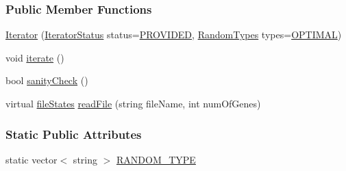 \subsubsection*{Public Member Functions}
\begin{DoxyCompactItemize}
\item 
\hyperlink{class_iterator_ab920b49c3035b9ca62557f9c211a9a12}{Iterator} (\hyperlink{class_iterator_a1eb24c519953c2a333ea4a345b0c679c}{Iterator\+Status} status=\hyperlink{class_iterator_a1eb24c519953c2a333ea4a345b0c679ca5988fd5ab1694c99fea267cb1bd5b980}{P\+R\+O\+V\+I\+D\+E\+D}, \hyperlink{class_iterator_a68bc1c5e7ad39ed78690beaa8a607430}{Random\+Types} types=\hyperlink{class_iterator_a68bc1c5e7ad39ed78690beaa8a607430ac26704076bf61ec7a63ef3ece6440a05}{O\+P\+T\+I\+M\+A\+L})
\item 
void \hyperlink{class_iterator_a39dd825e64aad150068b7b482685f264}{iterate} ()
\item 
bool \hyperlink{class_iterator_aff62fb96b13fa2d1d9ec489d413f7f54}{sanity\+Check} ()
\item 
virtual \hyperlink{class_file_coordinator_a87882b51519fff558b11f4862a021318}{file\+States} \hyperlink{class_iterator_a3da499aae907e1d3c1e98d41d986718b}{read\+File} (string file\+Name, int num\+Of\+Genes)
\end{DoxyCompactItemize}
\subsubsection*{Static Public Attributes}
\begin{DoxyCompactItemize}
\item 
static vector$<$ string $>$ \hyperlink{class_iterator_ad223ae399ddcff5d47b4991cf981932c}{R\+A\+N\+D\+O\+M\+\_\+\+T\+Y\+P\+E}
\end{DoxyCompactItemize}
